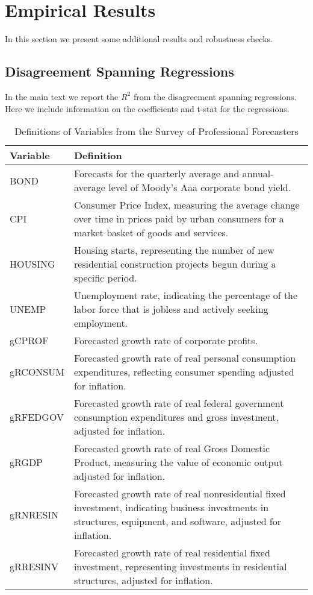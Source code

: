 \section{Empirical Results}\label{IAempirics}
In this section we present some additional results and robustness checks. 
\subsection{Disagreement Spanning Regressions}
In the main text we report the $R^2$ from the disagreement spanning regressions. Here we include information on the coefficients and t-stat for the regressions. 

\begin{table}[H]
\centering
\caption{Definitions of Variables from the Survey of Professional Forecasters}
\begin{tabular}{p{2.5cm} p{10cm}}
\hline
\hline
\textbf{Variable} & \textbf{Definition} \\
\hline
BOND & Forecasts for the quarterly average and annual-average level of Moody’s Aaa corporate bond yield. \\
CPI & Consumer Price Index, measuring the average change over time in prices paid by urban consumers for a market basket of goods and services. \\
HOUSING & Housing starts, representing the number of new residential construction projects begun during a specific period. \\
UNEMP & Unemployment rate, indicating the percentage of the labor force that is jobless and actively seeking employment. \\
gCPROF & Forecasted growth rate of corporate profits. \\
gRCONSUM & Forecasted growth rate of real personal consumption expenditures, reflecting consumer spending adjusted for inflation. \\
gRFEDGOV & Forecasted growth rate of real federal government consumption expenditures and gross investment, adjusted for inflation. \\
gRGDP & Forecasted growth rate of real Gross Domestic Product, measuring the value of economic output adjusted for inflation. \\
gRNRESIN & Forecasted growth rate of real nonresidential fixed investment, indicating business investments in structures, equipment, and software, adjusted for inflation. \\
gRRESINV & Forecasted growth rate of real residential fixed investment, representing investments in residential structures, adjusted for inflation. \\
\hline
\hline
\end{tabular}
\end{table}



